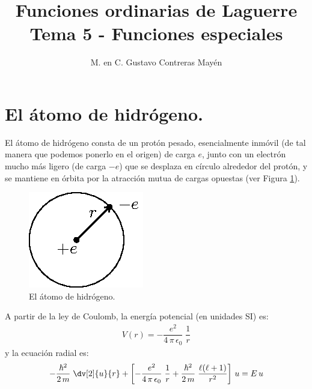 

\title{Funciones ordinarias de Laguerre \\ \large {Tema 5 - Funciones especiales} \vspace{-3ex}}
\author{M. en C. Gustavo Contreras Mayén}
\date{ }

\pagestyle{fancy}
\fancyhf{}
\lhead{\leftmark}
\rfoot{\thepage}
\setlength{\headheight}{16pt}%

\def\changemargin#1#2{\list{}{\rightmargin#2\leftmargin#1}\item[]}
\let\endchangemargin=\endlist 



\maketitle
\fontsize{14}{14}\selectfont
\tableofcontents
\newpage


\section{El átomo de hidrógeno.}

El átomo de hidrógeno consta de un protón pesado, esencialmente inmóvil (de tal manera que podemos ponerlo en el origen) de carga $e$, junto con un electrón mucho más ligero (de carga $-e$) que se desplaza en círculo alrededor del protón, y se mantiene en órbita por la atracción mutua de cargas opuestas (ver Figura \ref{fig:figura_01}).
\begin{figure}[H]
    \centering
    \includegraphics[scale=1.5]{Imagenes/atomohidrogeno.eps}
    \caption{El átomo de hidrógeno.}
    \label{fig:figura_01}
\end{figure}
A partir de la ley de Coulomb, la energía potencial (en unidades SI) es:
\begin{align}
V(r) = - \dfrac{e^{2}}{4 \, \pi \, \epsilon_{0}} \; \dfrac{1}{r}
\label{eq:ecuacion_04_52}
\end{align}
y la ecuación radial es:
\begin{align}
- \dfrac{\hbar^{2}}{2 \, m} \; \dv[2]{u}{r} + \left[ - \dfrac{e^{2}}{4 \, \pi \, \epsilon_{0}} \; \dfrac{1}{r} + \dfrac{\hbar^{2}}{2 \, m} \; \dfrac{\ell(\ell +1)}{r^{2}} \right] \, u =  E \, u
\label{eq:ecuacion_04_53}
\end{align}

